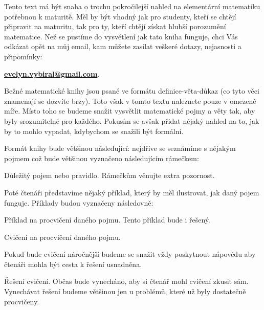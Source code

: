 

Tento text má být snaha o trochu pokročilejší nahled na elementární matematiku potřebnou k maturitě. Měl by být vhodný jak pro studenty, kteří se chtějí připravit na maturitu, tak pro ty, kteří chtějí získat hlubší porozumění matematice. Než se pustíme do vysvětlení jak tato kniha funguje, chci Vás odkázat opět na můj email, kam můžete zasílat veškeré dotazy, nejasnosti a připomínky: 
\begin{center}
  \textbf{\href{mailto: evelyn.vybiral@gmail.com}{evelyn.vybiral@gmail.com}}.
\end{center}

Bežné matematické knihy jsou psané ve formátu definice-věta-důkaz (co tyto věci znamenají se dozvíte brzy). Toto však v tomto textu naleznete pouze v omezené míře. Místo toho se budeme snažit vysvětlit matematické pojmy a věty tak, aby byly srozumitelné pro každého. Pokusím se avšak přidat nějaký nahled na to, jak by to mohlo vypadat, kdybychom se snažili být formální.

Formát knihy bude většinou následující: nejdříve se seznámíme s nějakým pojmem což bude většinou vyznačeno následujícím rámečkem:
\begin{definitionbox}
  Důležitý pojem nebo pravidlo. Rámečkům věnujte extra pozornost.
\end{definitionbox}
Poté čtenáři představíme nějaký příklad, který by měl ilustrovat, jak daný pojem funguje. Příklady budou vyznačeny následovně:
\begin{example}
  Příklad na procvičení daného pojmu. Tento příklad bude i řešený.
\end{example}
\begin{problem}
  Cvičení na procvičení daného pojmu. 
\end{problem}

\begin{hint}
  Pokud bude cvičení náročnější budeme se snažit vždy poskytnout nápovědu aby čtenáři mohla být cesta k řešení usnadněna.
\end{hint}

\begin{solution}
  Řešení cvičení. Občas bude vynecháno, aby si čtenář mohl cvičení zkusit sám. Vynechávat řešení budeme většinou jen u problémů, které už byly dostatečně procvičeny.
\end{solution}
